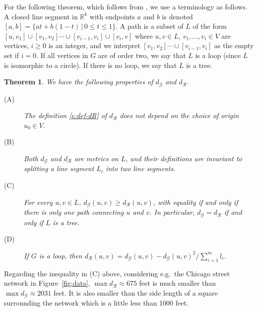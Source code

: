 \documentclass[alpha-refs]{wiley-article}
\newtheorem{thm}{Theorem}
\begin{document}
For the following theorem, which follows from \citet[][Propositions~2-4]{AnderesEtAl}, we use a terminology as follows. 
A closed line segment in $\mathbb R^k$ with endpoints $a$ and $b$ is denoted $[a,b]=\{at+b(1-t)\,|\, 0\le t\le 1\}$.
A path is a subset of $L$ of the form $[u,v_1]\cup [v_1,v_2]\cdots\cup [v_{i-1},v_{i}]\cup[v_{i},v]$ where $u,v\in L$, $v_1,\ldots,v_i\in V$ are vertices, $i\ge0$ is an integer, and we interpret $[v_1,v_2]\cdots\cup [v_{i-1},v_{i}]$ as the empty set if $i=0$. 
If all vertices in $G$ are of order two, we say that $L$ is a loop (since $L$ is isomorphic to a circle). If there is no loop, we say that $L$ is a tree.  

\begin{thm}\label{t:res-m} We have the following properties of $d_{\mathcal{G}}$ and $d_{\mathcal{R}}$.
\begin{description}
\item[(A)] The definition \eqref{e:def-dR} of $d_{\mathcal{R}}$ does not depend on the choice of origin $u_0\in V$.
\item[(B)] Both $d_{\mathcal{G}}$ and $d_{\mathcal{R}}$ are metrics on $L$, and their definitions are invariant to splitting a line segment $L_i$ into two line segments.
\item[(C)] For every $u,v\in L$, $d_\mathcal{G}(u,v)\ge d_\mathcal{R}(u,v)$, with equality if and only if there is only one path connecting $u$ and $v$. In particular,
$d_\mathcal{G}= d_\mathcal{R}$ if and only if $L$ is a tree.
\item[(D)] If $G$ is a loop, then $d_{\mathcal{R}}(u,v)=d_{\mathcal{G}}(u,v)-d_{\mathcal{G}}(u,v)^2/\sum_{i=1}^ml_i$.
\end{description} 
\end{thm}

Regarding the inequality in (C) above, %
considering e.g.\ the Chicago street network in Figure~\ref{fig:data}, 
 $\max d_{\mathcal R}\approx 675$  
feet is much smaller than $\max d_{\mathcal G}\approx 2031$ feet. It is also smaller than the side length of a square surrounding the network which is a little less than 1000 feet.

\end{document}

